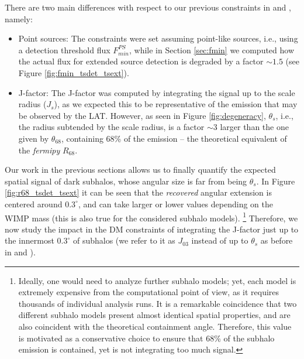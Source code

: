 \documentclass[%
 reprint,
nofootinbib,
 amsmath,amssymb,
 aps,
]{revtex4-2}
\begin{document}
There are two main differences with respect to our previous constraints in  and , namely:

\begin{itemize}
    \item {Point sources:} The constraints were set assuming point-like sources, i.e., using a detection threshold flux $F_{min}^{PS}$, while in Section \ref{sec:fmin} we computed how the actual flux for extended source detection is degraded by a factor $\sim1.5$ (see Figure \ref{fig:fmin_tsdet_tsext}).
    
    \item {J-factor:} The J-factor was computed by integrating the signal up to the scale radius ($J_s$), as we expected this to be representative of the emission that may be observed by the LAT. However, as seen in Figure \ref{fig:degeneracy}, $\theta_s$, i.e., the radius subtended by the scale radius, is a factor $\sim3$ larger than the one given by $\theta_{68}$, containing 68\% of the emission -- the theoretical equivalent of the \textit{fermipy} $R_{68}$.
\end{itemize}

Our work in the previous sections allows us to finally quantify the expected spatial signal of dark subhalos, whose angular size is far from being $\theta_s$. In Figure \ref{fig:r68_tsdet_tsext} it can be seen that the {\it recovered} angular extension is centered around $0.3^\circ$, and can take larger or lower values depending on the WIMP mass (this is also true for the considered subhalo models). \footnote{Ideally, one would need to analyze further subhalo models; yet, each model is extremely expensive from the computational point of view, as it requires thousands of individual analysis runs. It is a remarkable coincidence that two different subhalo models present almost identical spatial properties, and are also coincident with the theoretical containment angle. Therefore, this value is motivated as a conservative choice to ensure that 68\% of the subhalo emission is contained, yet is not integrating too much signal.} Therefore, we now study the impact in the DM constraints of integrating the J-factor just up to the innermost $0.3^\circ$ of subhalos (we refer to it as $J_{03}$ instead of up to $\theta_s$ as before in  and ).
\end{document}
